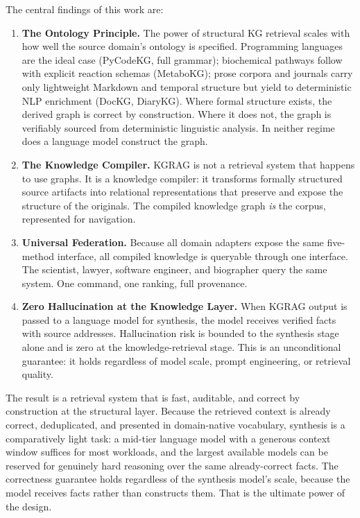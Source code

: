 \documentclass[10pt]{article}
\begin{document}
The central findings of this work are:

\begin{enumerate}

\item \textbf{The Ontology Principle.} The power of structural KG retrieval
  scales with how well the source domain's ontology is specified. Programming
  languages are the ideal case (PyCodeKG, full grammar); biochemical pathways
  follow with explicit reaction schemas (MetaboKG); prose corpora and journals
  carry only lightweight Markdown and temporal structure but yield to
  deterministic NLP enrichment (DocKG, DiaryKG). Where formal structure
  exists, the derived graph is correct by construction. Where it does not,
  the graph is verifiably sourced from deterministic linguistic analysis. In
  neither regime does a language model construct the graph.

\item \textbf{The Knowledge Compiler.} KGRAG is not a retrieval system that
  happens to use graphs. It is a knowledge compiler: it transforms formally
  structured source artifacts into relational representations that preserve and
  expose the structure of the originals. The compiled knowledge graph \emph{is}
  the corpus, represented for navigation.

\item \textbf{Universal Federation.} Because all domain adapters expose the
  same five-method interface, all compiled knowledge is queryable through one
  interface. The scientist, lawyer, software engineer, and biographer query the
  same system. One command, one ranking, full provenance.

\item \textbf{Zero Hallucination at the Knowledge Layer.} When KGRAG output is
  passed to a language model for synthesis, the model receives verified facts
  with source addresses. Hallucination risk is bounded to the synthesis stage
  alone and is zero at the knowledge-retrieval stage. This is an unconditional
  guarantee: it holds regardless of model scale, prompt engineering, or
  retrieval quality.

\end{enumerate}

The result is a retrieval system that is fast, auditable, and correct by
construction at the structural layer. Because the retrieved context is already
correct, deduplicated, and presented in domain-native vocabulary, synthesis
is a comparatively light task: a mid-tier language model with a generous
context window suffices for most workloads, and the largest available models
can be reserved for genuinely hard reasoning over the same already-correct
facts. The correctness guarantee holds regardless of the synthesis model's
scale, because the model receives facts rather than constructs them. That is
the ultimate power of the design.
\end{document}

